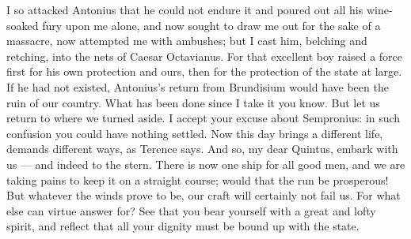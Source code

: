  I so attacked Antonius that he could not endure it and poured out all his wine-soaked fury upon me alone, and now sought to draw me out for the sake of a massacre, now attempted me with ambushes; but I cast him, belching and retching, into the nets of Caesar Octavianus. For that excellent boy raised a force first for his own protection and ours, then for the protection of the state at large. If he had not existed, Antonius's return from Brundisium would have been the ruin of our country. What has been done since I take it you know. But let us return to where we turned aside. I accept your excuse about Sempronius: in such confusion you could have nothing settled. Now this day brings a different life, demands different ways, as Terence says. And so, my dear Quintus, embark with us --- and indeed to the stern. There is now one ship for all good men, and we are taking pains to keep it on a straight course; would that the run be prosperous! But whatever the winds prove to be, our craft will certainly not fail us. For what else can virtue answer for? See that you bear yourself with a great and lofty spirit, and reflect that all your dignity must be bound up with the state.
